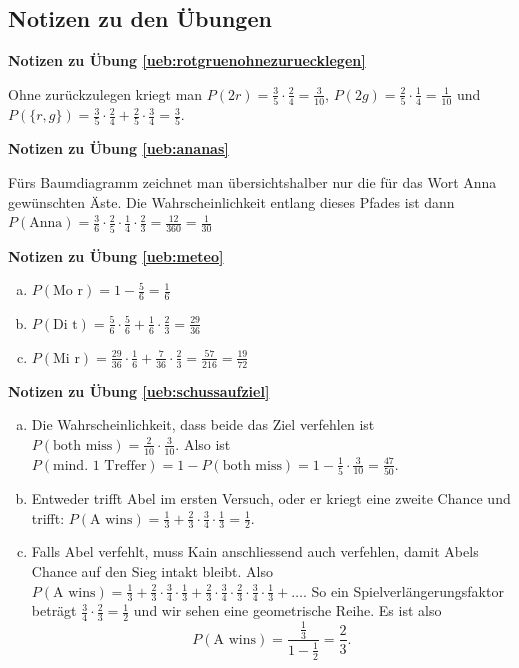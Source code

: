 \documentclass[%
<<<<<<< Updated upstream
11pt,%
twoside,%
titlepage,%
german,%
=======
11pt,%
twoside,%
titlepage,%
swissgerman,%
>>>>>>> Stashed changes
headsepline%
]{scrartcl}
\newcommand{\faReturnGray}{\textcolor{gray}{\faMailReply}} %
\theoremstyle{definition}
\theoremstyle{plain}
\newcommand{\concatueb}[1]{ueb:#1}%
\newcommand{\concatlsg}[1]{lsg:#1}%
\newenvironment{lsg}[1]{%
    \par\noindent\textbf{Notizen zu Übung \ref{\concatueb{#1}}}\label{\concatlsg{#1}}
    \hfill\hyperref[\concatueb{#1}]{\faReturnGray}\par %
}{%
    \par%
}
\newcommand{\concatueb}[1]{ueb:#1}%
\newcommand{\concatlsg}[1]{lsg:#1}%
\newenvironment{lsg}[1]{%
    \par\noindent\textbf{Notizen zu Übung \ref{\concatueb{#1}}.}%
    \label{\concatlsg{#1}}
}{%
    \par%
}
\begin{document}
\clearpage

\subsection{Notizen zu den \"Ubungen}

\begin{lsg}{rotgruenohnezuruecklegen}
Ohne zur\"uckzulegen kriegt man $P(2r)=\frac{3}{5}\cdot\frac{2}{4}=\frac{3}{10}$, $P(2g)=\frac{2}{5}\cdot\frac{1}{4}=\frac{1}{10}$ und $P(\{r,g\})=\frac{3}{5}\cdot\frac{2}{4}+\frac{2}{5}\cdot\frac{3}{4}=\frac{3}{5}$.
\end{lsg}

\begin{lsg}{ananas}
F\"urs Baumdiagramm zeichnet man \"ubersichtshalber nur die f\"ur das Wort Anna gew\"unschten \"Aste. Die Wahrscheinlichkeit entlang dieses Pfades ist dann $P(\text{Anna})=\frac{3}{6}\cdot\frac{2}{5}\cdot\frac{1}{4}\cdot\frac{2}{3}=\frac{12}{360}=\frac{1}{30}$
\end{lsg}

\begin{lsg}{meteo}
\begin{enumerate}[a)]
\item $P(\text{Mo r})=1-\frac{5}{6}=\frac{1}{6}$
\item $P(\text{Di t})=\frac{5}{6}\cdot\frac{5}{6}+\frac{1}{6}\cdot\frac{2}{3}=\frac{29}{36}$
\item $P(\text{Mi r})=\frac{29}{36}\cdot\frac{1}{6}+\frac{7}{36}\cdot\frac{2}{3}=\frac{57}{216}=\frac{19}{72}$
\end{enumerate}
\end{lsg}

\begin{lsg}{schussaufziel}
\begin{enumerate}[a)]
\item Die Wahrscheinlichkeit, dass beide das Ziel verfehlen ist $P(\text{both miss})=\frac{2}{10}\cdot\frac{3}{10}$. Also ist $P(\text{mind. 1 Treffer})=1-P(\text{both miss})=1-\frac{1}{5}\cdot\frac{3}{10}=\frac{47}{50}$.
\item Entweder trifft Abel im ersten Versuch, oder er kriegt eine zweite Chance und trifft: $P(\text{A wins})=\frac{1}{3}+\frac{2}{3}\cdot\frac{3}{4}\cdot\frac{1}{3}=\frac{1}{2}$.
\item Falls Abel verfehlt, muss Kain anschliessend auch verfehlen, damit Abels Chance auf den Sieg intakt bleibt. Also $P(\text{A wins})=\frac{1}{3}+\frac{2}{3}\cdot\frac{3}{4}\cdot\frac{1}{3}+\frac{2}{3}\cdot\frac{3}{4}\cdot\frac{2}{3}\cdot\frac{3}{4}\cdot\frac{1}{3}+\dots$. So ein \glqq Spielverl\"angerungsfaktor betr\"agt $\frac{3}{4}\cdot\frac{2}{3}=\frac{1}{2}$ und wir sehen eine geometrische Reihe. Es ist also
$$P(\text{A wins})=\frac{\frac{1}{3}}{1-\frac{1}{2}}=\frac{2}{3}.$$
\end{enumerate}
\end{lsg}
\end{document}

